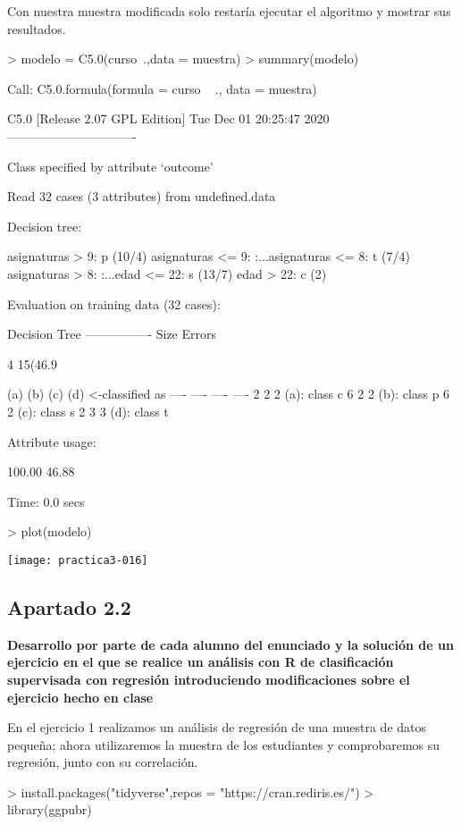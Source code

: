\documentclass[a4paper]{article}
\begin{document}
Con nuestra muestra modificada solo restaría ejecutar el algoritmo y mostrar sus resultados.
\begin{Schunk}
\begin{Sinput}
> modelo = C5.0(curso~.,data = muestra)
> summary(modelo)
\end{Sinput}
\begin{Soutput}
Call:
C5.0.formula(formula = curso ~ ., data = muestra)


C5.0 [Release 2.07 GPL Edition]  	Tue Dec 01 20:25:47 2020
-------------------------------

Class specified by attribute `outcome'

Read 32 cases (3 attributes) from undefined.data

Decision tree:

asignaturas > 9: p (10/4)
asignaturas <= 9:
:...asignaturas <= 8: t (7/4)
    asignaturas > 8:
    :...edad <= 22: s (13/7)
        edad > 22: c (2)


Evaluation on training data (32 cases):

	    Decision Tree   
	  ----------------  
	  Size      Errors  

	     4   15(46.9%)   <<


	   (a)   (b)   (c)   (d)    <-classified as
	  ----  ----  ----  ----
	     2     2     2          (a): class c
	           6     2     2    (b): class p
	                 6     2    (c): class s
	           2     3     3    (d): class t


	Attribute usage:

	100.00%	asignaturas
	 46.88%	edad


Time: 0.0 secs
\end{Soutput}
\begin{Sinput}
> plot(modelo)
\end{Sinput}
\end{Schunk}
\texttt{[image: practica3-016]}


\subsection{Apartado 2.2}
\textbf{Desarrollo por parte de cada alumno del enunciado y la solución de un ejercicio en el que se realice un análisis con R de clasificación supervisada con regresión introduciendo modificaciones sobre el ejercicio hecho en clase}

En el ejercicio 1 realizamos un análisis de regresión de una muestra de datos pequeña; ahora utilizaremos la muestra de los estudiantes y comprobaremos su regresión, junto con su correlación.
\begin{Schunk}
\begin{Sinput}
> install.packages("tidyverse",repos = "https://cran.rediris.es/")
> library(ggpubr)
\end{Sinput}
\end{Schunk}
\end{document}
